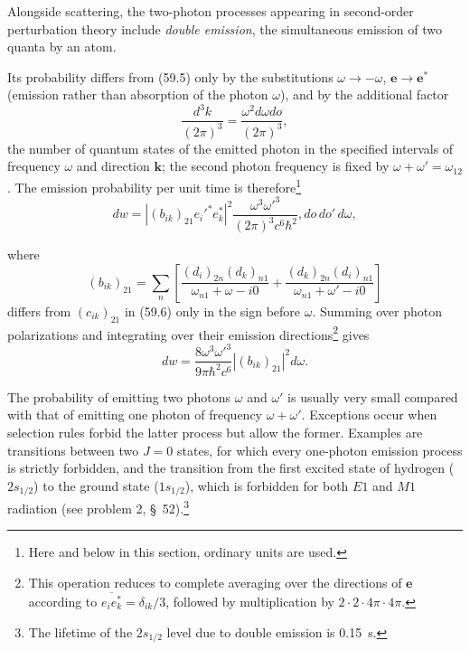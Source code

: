 Alongside scattering, the two-photon processes appearing in second-order perturbation theory include \emph{double emission}, the simultaneous emission of two quanta by an atom.

Its probability differs from (59.5) only by the substitutions $\omega\to-\omega$, $\mathbf e\to\mathbf e^*$ (emission rather than absorption of the photon $\omega$), and by the additional factor
\[
\frac{d^3k}{(2\pi)^3}=\frac{\omega^2d\omega do}{(2\pi)^3},
\]
the number of quantum states of the emitted photon in the specified intervals of frequency $\omega$ and direction $\mathbf k$; the second photon frequency is fixed by $\omega+\omega'=\omega_{12}$. The emission probability per unit time is therefore\footnote{Here and below in this section, ordinary units are used.}
\begin{equation}
dw=\left|(b_{ik})_{21}e_i'^*e_k^*\right|^2
\frac{\omega^3\omega'^3}{(2\pi)^3c^6\hbar^2},do\,do'\,d\omega,
\tag{59.27}
\end{equation}

where
\[
(b_{ik})_{21}=\sum_n\left[
\frac{(d_i)_{2n}(d_k)_{n1}}{\omega_{n1}+\omega-i0}
+\frac{(d_k)_{2n}(d_i)_{n1}}{\omega_{n1}+\omega'-i0}\right]
\]
differs from $(c_{ik})_{21}$ in (59.6) only in the sign before $\omega$. Summing over photon polarizations and integrating over their emission directions\footnote{This operation reduces to complete averaging over the directions of $\mathbf e$ according to $\overline{e_i e_k^*}=\delta_{ik}/3$, followed by multiplication by $2\cdot2\cdot4\pi\cdot4\pi$.} gives
\begin{equation}
dw=\frac{8\omega^3\omega'^3}{9\pi\hbar^2c^6}|(b_{ik})_{21}|^2d\omega.
\tag{59.28}
\end{equation}

The probability of emitting two photons $\omega$ and $\omega'$ is usually very small compared with that of emitting one photon of frequency $\omega+\omega'$. Exceptions occur when selection rules forbid the latter process but allow the former. Examples are transitions between two $J=0$ states, for which every one-photon emission process is strictly forbidden, and the transition from the first excited state of hydrogen ($2s_{1/2}$) to the ground state ($1s_{1/2}$), which is forbidden for both $E1$ and $M1$ radiation (see problem 2, \S~52).\footnote{The lifetime of the $2s_{1/2}$ level due to double emission is 0.15~s.}

